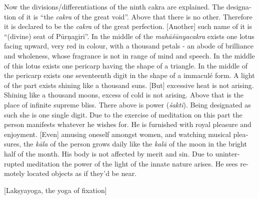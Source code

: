 \begin{otherlanguage}{english}
\begin{tlate}
Now the divisions/differentiations of the ninth cakra are explained. The designation of it is ``the \textit{cakra} of the great void''. Above that there is no other. Therefore it is declared to be the \textit{cakra} of the great perfection. [Another] such name of it is ``(divine) seat of Pūrṇagiri''. In the middle of the \textit{mahāśūnyacakra} exists one lotus facing upward, very red in colour, with a thousand petals - an abode of brilliance and wholeness, whose fragrance is not in range of mind and speech. In the middle of this lotus exists one pericarp having the shape of a triangle. In the middle of the pericarp exists one seventeenth digit in the shape of a immaculé form. A light of the part exists shining like a thousand suns. [But] excessive heat is not arising. Shining like a thousand moons, excess of cold is not arising.  Above that is the place of infinite supreme bliss. There above is power (\textit{śakti}). Being designated as such she is one single digit. Due to the exercise of meditation on this part the person manifests whatever he wishes for. He is furnished with royal pleasure and enjoyment. [Even] amusing oneself amongst women, and watching musical pleasures, the \textit{kāla} of the person grows daily like the \textit{kalā} of the moon in the bright half of the month. His body is not affected by merit and sin. Due to uninterrupted meditation the power of the light of the innate nature arises. He sees remotely located objects as if they'd be near.
\end{tlate}
     \bigskip
    \centerline{\textrm{\small{[Lakṣyayoga, the yoga of fixation]}}}

\end{otherlanguage}
